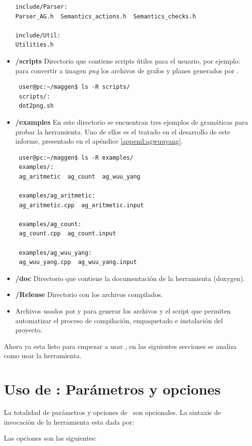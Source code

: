 \begin{itemize}
{\begin{verbatim}
include/Parser:
Parser_AG.h  Semantics_actions.h  Semantics_checks.h

include/Util:
Utilities.h
\end{verbatim}}

\item \textbf{/scripts} Directorio que contiene scripts útiles para el usuario, por ejemplo:  para convertir a imagen \textit{png} los archivos de grafos y planes generados por \maggen.
{\footnotesize \begin{verbatim}
 user@pc:~/maggen$ ls -R scripts/
 scripts/:
 dot2png.sh
\end{verbatim} }
 
\item \textbf{/examples} En este directorio se encuentran tres ejemplos de gramáticas para probar la herramienta. Uno de ellos es el tratado en el desarrollo de este informe, presentado en el apéndice \ref{append:agwuuyang}. 
{\footnotesize \begin{verbatim}
 user@pc:~/maggen$ ls -R examples/
 examples/:
 ag_aritmetic  ag_count  ag_wuu_yang

 examples/ag_aritmetic:
 ag_aritmetic.cpp  ag_aritmetic.input

 examples/ag_count:
 ag_count.cpp  ag_count.input

 examples/ag_wuu_yang:
 ag_wuu_yang.cpp  ag_wuu_yang.input
\end{verbatim} }

\item \textbf{/doc} Directorio que contiene la documentación de la herramienta (doxygen).
\item \textbf{/Release} Directorio con los archivos compilados.
\item Archivos usados por  y  para generar los archivos  y el script  que permiten automatizar el proceso de compilación, empaquetado e instalación del proyecto.
\end{itemize}

Ahora ya esta listo para empezar a usar \maggen, en las siguientes secciones se analiza como usar la herramienta.

\section{Uso de \maggen: Parámetros y opciones}
\label{sec:uso-maggen}
La totalidad de parámetros y opciones de \maggen\ son opcionales. La sintaxis de invocación de la herramienta esta dada por:\\
\begin{center}\end{center}
Las opciones son las siguientes:

